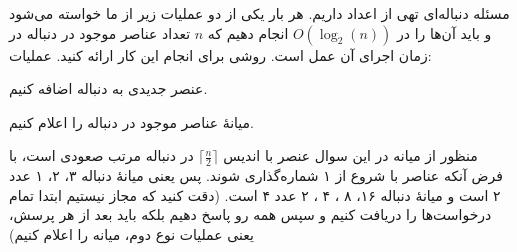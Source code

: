 ﻿%
‌مسئله
دنباله‌ای تهی از اعداد داریم.
هر بار یکی از دو عملیات زیر از ما خواسته می‌شود و باید آن‌ها را در
 $O(\log_{2}(n))$ 
انجام دهیم که
 $n$ 
تعداد عناصر موجود در دنباله در زمان اجرای آن عمل است.
 روشی برای انجام این کار ارائه کنید.
عملیات:
    \item عنصر جدیدی به دنباله اضافه کنیم.
    \item میانهٔ عناصر موجود در دنباله را اعلام کنیم.

منظور از میانه در این سوال عنصر با اندیس
 $\lceil \frac{n}{2} \rceil$ 
در دنباله مرتب‌ صعودی است، با فرض آنکه عناصر با شروع از ۱ شماره‌گذاری شوند. پس یعنی میانهٔ دنباله
۳، ۲، ۱
عدد ۲ است و میانهٔ دنباله 
۱۶، ۸ ، ۴ ، ۲
عدد ۴ است.
(دقت کنید که مجاز نیستیم ابتدا تمام درخواست‌ها را دریافت کنیم و سپس همه رو پاسخ دهیم بلکه باید بعد از هر پرسش، یعنی عملیات نوع دوم، میانه را اعلام کنیم)










